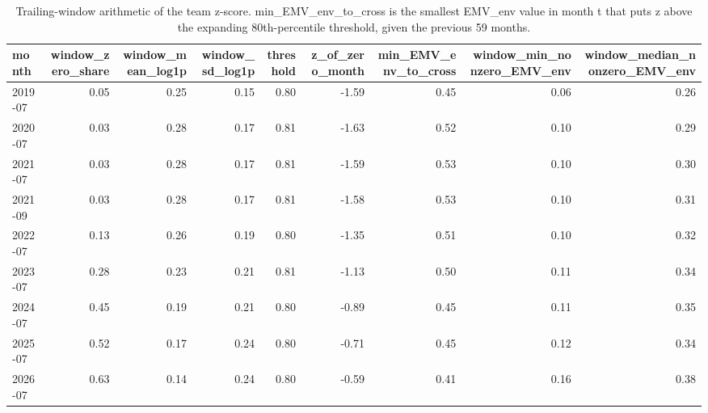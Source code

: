 \begin{table}
\caption{Trailing-window arithmetic of the team z-score. min\_EMV\_env\_to\_cross is the smallest EMV\_env value in month t that puts z above the expanding 80th-percentile threshold, given the previous 59 months.}
\label{tab:m1_window}
\begin{tabular}{lrrrrrrrr}
\toprule
month & window\_zero\_share & window\_mean\_log1p & window\_sd\_log1p & threshold & z\_of\_zero\_month & min\_EMV\_env\_to\_cross & window\_min\_nonzero\_EMV\_env & window\_median\_nonzero\_EMV\_env \\
\midrule
2019-07 & 0.05 & 0.25 & 0.15 & 0.80 & -1.59 & 0.45 & 0.06 & 0.26 \\
2020-07 & 0.03 & 0.28 & 0.17 & 0.81 & -1.63 & 0.52 & 0.10 & 0.29 \\
2021-07 & 0.03 & 0.28 & 0.17 & 0.81 & -1.59 & 0.53 & 0.10 & 0.30 \\
2021-09 & 0.03 & 0.28 & 0.17 & 0.81 & -1.58 & 0.53 & 0.10 & 0.31 \\
2022-07 & 0.13 & 0.26 & 0.19 & 0.80 & -1.35 & 0.51 & 0.10 & 0.32 \\
2023-07 & 0.28 & 0.23 & 0.21 & 0.81 & -1.13 & 0.50 & 0.11 & 0.34 \\
2024-07 & 0.45 & 0.19 & 0.21 & 0.80 & -0.89 & 0.45 & 0.11 & 0.35 \\
2025-07 & 0.52 & 0.17 & 0.24 & 0.80 & -0.71 & 0.45 & 0.12 & 0.34 \\
2026-07 & 0.63 & 0.14 & 0.24 & 0.80 & -0.59 & 0.41 & 0.16 & 0.38 \\
\bottomrule
\end{tabular}
\end{table}
